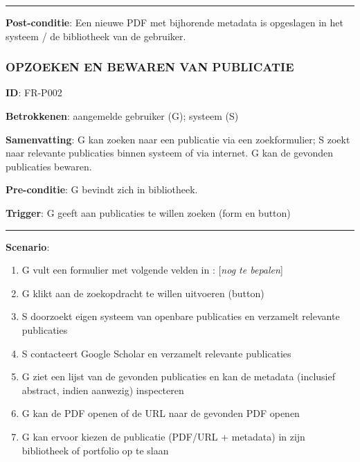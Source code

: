 \vspace{2 mm}
\hrule
\vspace{4 mm}


\noindent \textbf{Post-conditie}: Een nieuwe PDF met bijhorende metadata is opgeslagen in het systeem / de bibliotheek van de gebruiker. \\



\subsubsection{OPZOEKEN EN BEWAREN VAN PUBLICATIE}
\vspace{2 mm}

\textbf{ID}: FR-P002
\vspace{2 mm}

\noindent \textbf{Betrokkenen}: aangemelde gebruiker (G); systeem (S) 
\vspace{2 mm}

\noindent \textbf{Samenvatting}: G kan zoeken naar een publicatie via een zoekformulier; S zoekt naar relevante publicaties binnen systeem of via internet. G kan de gevonden publicaties bewaren. 
\vspace{2 mm}

\noindent \textbf{Pre-conditie}: G bevindt zich in bibliotheek. 
\vspace{2 mm}

\noindent \textbf{Trigger}: G geeft aan publicaties te willen zoeken (form en button)
\vspace{4 mm}

\hrule
\vspace{2 mm}
\noindent \textbf{Scenario}:
\begin{enumerate}
\item G vult een formulier met volgende velden in :  [{\it nog te bepalen}]
\item G klikt aan de zoekopdracht te willen uitvoeren (button)
\item S doorzoekt eigen systeem van openbare publicaties en verzamelt relevante publicaties
\item S contacteert Google Scholar en verzamelt relevante publicaties
\item G ziet een lijst van de gevonden publicaties en kan de metadata (inclusief abstract, indien aanwezig) inspecteren
\item G kan de PDF openen of de URL naar de gevonden PDF openen 
\item G kan ervoor kiezen de publicatie (PDF/URL + metadata) in zijn bibliotheek of portfolio op te slaan
\end{enumerate}

